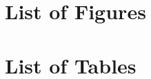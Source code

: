 \documentclass[
	11pt, %
]{beamer}
\begin{document}
\section{List of Figures} %

\section{List of Tables} %



	
	
	
	
\end{document}
